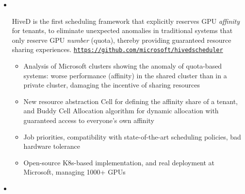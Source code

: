   \begin{itemize}[leftmargin=*]
    \item
      \vspace{-10pt}\\
      {
          HiveD is the first scheduling framework that explicitly reserves GPU \textit{affinity} for tenants, to eliminate unexpected anomalies in traditional systems that only reserve GPU \textit{number} (quota), thereby providing guaranteed resource sharing experiences. \texttt{\url{https://github.com/microsoft/hivedscheduler}}

          \vspace{-5pt}
          \begin{itemize}[leftmargin=*]
            \item Analysis of Microsoft clusters showing the anomaly of quota-based systems: worse performance (affinity) in the shared cluster than in a private cluster, damaging the incentive of sharing resources
            \item New resource abstraction Cell for defining the affinity share of a tenant, and Buddy Cell Allocation algorithm for dynamic allocation with guaranteed access to everyone's own affinity
            \item Job priorities, compatibility with state-of-the-art scheduling policies, bad hardware tolerance
            \item Open-source K8s-based implementation, and real deployment at Microsoft, managing 1000+ GPUs
          \end{itemize}
      }
    \item
      \vspace{-10pt}\\
      {

}
\end{itemize}

